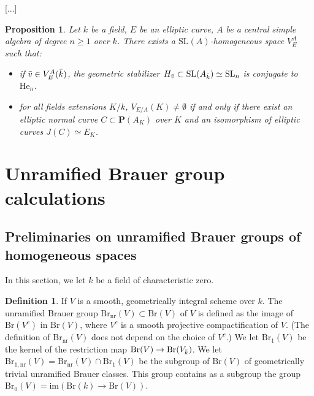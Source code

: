 \documentclass[10pt,letterpaper,twoside]{article}
\renewcommand{\1}{\mathbf{1}}
\newcommand{\bP}{\mathbf{P}}
\newcommand{\nr}{\mathrm{nr}}
\newcommand{\im}{\mathrm{im}}
\renewcommand{\geq}{\geqslant}
\newcommand{\Br}{\mathrm{Br}}
\theoremstyle{plain}
\newtheorem{proposition}[theorem]{Proposition}
\theoremstyle{plain}
\theoremstyle{definition}
\theoremstyle{named}
\theoremstyle{definition}
\newtheorem{definition}[theorem]{Definition}
\begin{document}
	
	[...]
	
	\begin{proposition}
		Let $k$ be a field, $E$ be an elliptic curve, $A$ be a central simple algebra of degree $n\geq 1$ over $k$. There exists a $\mathrm{SL}(A)$-homogeneous space $V_E^A$ such that:
		\begin{itemize}
			\item if $\Bar{v}\in V_E^A(\Bar{k})$, the geometric stabilizer $H_{\Bar{v}}\subset \mathrm{SL}(A_{\Bar{k}})\simeq \mathrm{SL}_n$ is conjugate to $\mathrm{He}_n$. 
			\item for all fields extensions $K/k$, $V_{E/A}(K)\neq\emptyset$ if and only if there exist an elliptic normal curve $C\subset \bP(A_K)$ over $K$ and an isomorphism of elliptic curves $J(C)\simeq E_K$.
		\end{itemize}
	\end{proposition}
	
	
	
	
	\section{Unramified Brauer group calculations}
	
	\subsection{Preliminaries on unramified Brauer groups of homogeneous spaces}
	
	In this section, we let $k$ be a field of characteristic zero.
	
	\begin{definition}
		If $V$ is a smooth, geometrically integral scheme over $k$. The unramified Brauer group $\Br_{\nr}(V)\subset \Br(V)$ of $V$ is defined as the image of $\Br(V^c)$ in $\Br(V)$, where $V^c$ is a smooth projective compactification of $V$. (The definition of $\Br_{\nr}(V)$ does not depend on the choice of $V^c$.) We
		let $\Br_1(V)$ be the kernel of the restriction map $\Br(V)\to \Br(V_{\Bar{k}})$. We let $\Br_{1,\nr}(V)=\Br_\nr(V)\cap\Br_1(V)$ be the subgroup of $\Br(V)$ of geometrically trivial unramified Brauer classes. This group contains as a
		subgroup the group $\Br_0(V)=\im(\Br(k)\rightarrow\Br(V))$.
	\end{definition}
	
\end{document}
